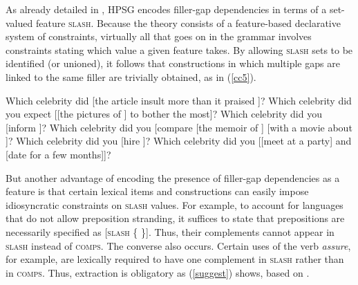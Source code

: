 \documentclass[output=paper
 	        ,biblatex
                ,babelshorthands
                ,newtxmath
                ,draftmode
                ,colorlinks, citecolor=brown
]{langscibook}
\begin{document}
As already detailed in , HPSG encodes filler-gap dependencies in terms of a
set-valued feature \textsc{slash}. Because the theory consists of a feature-based declarative system of
constraints, virtually all that goes on in the grammar involves constraints stating which value a
given feature takes. By allowing \textsc{slash} sets to be identified (or unioned), it
follows that constructions in which multiple gaps are linked to the same filler are trivially
obtained, as in (\ref{cc5}).

\eal
\label{cc5}
\ex Which celebrity did  [the article insult \spc more than it praised \spc]?
\ex Which celebrity  did you expect [[the pictures of \spc ] to bother \spc the most]?
\ex Which celebrity did you [inform ]?
\ex Which celebrity did you [compare [the memoir of \spc] [with a movie about \spc]?
\ex Which celebrity  did you [hire ]?
\ex Which celebrity  did you [[meet \spcs at a party] and [date \spcs for a few months]]?
\zl 

But another advantage of encoding the presence of filler-gap dependencies as a feature is that
certain lexical items and constructions can easily impose idiosyncratic constraints on \textsc{slash}
values. For example, to account for  languages that do not allow preposition stranding,
it suffices to state that prepositions are necessarily specified as [\textsc{slash} \{ \}]. Thus,
their complements cannot appear in \textsc{slash} instead of \textsc{comps}. 
The converse also occurs. Certain uses of the verb \emph{assure}, for example, 
are lexically required to have one complement in \textsc{slash} rather than in \textsc{comps}. Thus,
extraction is obligatory as (\ref{suggest}) shows, based on .
   
\eal \label{suggest}   




\zl
\end{document}
